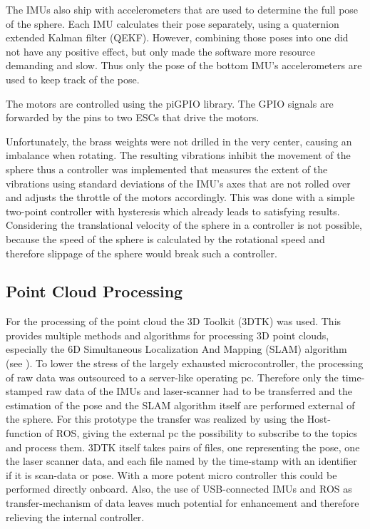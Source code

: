 The IMUs also ship with accelerometers that are used to determine the full pose of the sphere. Each IMU calculates their pose separately, using a quaternion extended Kalman filter (QEKF). However, combining those poses into one did not have any positive effect, but only made the software more resource demanding and slow. Thus only the pose of the bottom IMU's accelerometers are used to keep track of the pose.

The motors are controlled using the piGPIO library. The GPIO signals are forwarded by the pins to two ESCs that drive the motors. 

Unfortunately, the brass weights were not drilled in the very center, causing an imbalance when rotating. The resulting vibrations inhibit the movement of the sphere thus a controller was implemented that measures the extent of the vibrations using standard deviations of the IMU's axes that are not rolled over and adjusts the throttle of the motors accordingly. This was done with a simple two-point controller with hysteresis which already leads to satisfying results. Considering the translational velocity of the sphere in a controller is not possible, because the speed of the sphere is calculated by the rotational speed and therefore slippage of the sphere would break such a controller. 

\subsection{Point Cloud Processing}                                                                                                                                                                                  
\label{sec:TechnicalApproach:3dMapping}
For the processing of the point cloud the 3D Toolkit (3DTK) was used. This provides multiple methods and algorithms for processing 3D point clouds, especially the 6D Simultaneous Localization And Mapping (SLAM) algorithm (see \cite{JFR2006}). To lower the stress of the largely exhausted microcontroller, the processing of raw data was outsourced to a server-like operating pc. Therefore only the time-stamped raw data of the IMUs and laser-scanner had to be transferred and the estimation of the pose and the SLAM algorithm itself are performed external of the sphere. For this prototype the transfer was realized by using the Host-function of ROS, giving the external pc the possibility to subscribe to the topics and process them. 3DTK itself takes pairs of files, one representing the pose, one the laser scanner data, and each file named by the time-stamp with an identifier if it is scan-data or pose. With a more potent micro controller this could be performed directly onboard. Also, the use of USB-connected IMUs and ROS as transfer-mechanism of data leaves much potential for enhancement and therefore relieving the internal controller.
